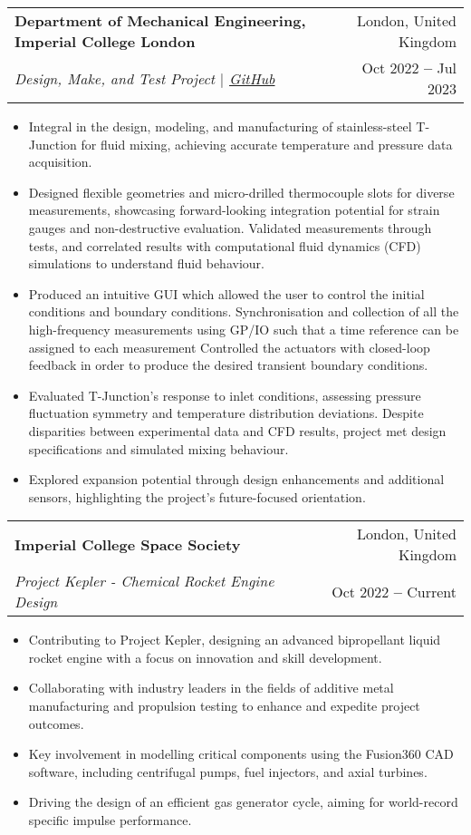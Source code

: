 \documentclass[letterpaper,11pt]{article}
\makeatletter
\newcommand{\resumeItem}[1]{
  \item\small{
    {#1 \vspace{-2pt}}
  }
}
\newcommand{\resumeSubheading}[4]{
  \vspace{-2pt}\item
    \begin{tabular*}{0.97\textwidth}[t]{l@{\extracolsep{\fill}}r}
      \textbf{#1} & #2 \\
      \textit{\small#3} & \small #4 \\
    \end{tabular*}\vspace{-7pt}
}
\newcommand{\resumeItemListStart}{\begin{itemize}}
\newcommand{\resumeItemListEnd}{\end{itemize}\vspace{-5pt}}
\makeatother
\begin{document}
    \resumeSubheading
      {Department of Mechanical Engineering, Imperial College London}{London, United Kingdom}
      {Design, Make, and Test Project $|$ \emph{\href{https://github.com/jimmyvdw/DMT16_DAQ}{\color{blue}GitHub}}}{Oct 2022 \textbf{--} Jul 2023}
        \resumeItemListStart
            \resumeItem{Integral in the design, modeling, and manufacturing of stainless-steel T-Junction for fluid mixing, achieving accurate temperature and pressure data acquisition.}
            \resumeItem{Designed flexible geometries and micro-drilled thermocouple slots for diverse measurements, showcasing forward-looking integration potential for strain gauges and non-destructive evaluation. Validated measurements through tests, and correlated results with computational fluid dynamics (CFD) simulations to understand fluid behaviour.}
            \resumeItem{Produced an intuitive GUI which allowed the user to control the initial conditions and boundary conditions. Synchronisation and collection of all the high-frequency measurements using GP/IO such that a time reference can be assigned to each measurement Controlled the actuators with closed-loop feedback in order to produce the desired transient boundary conditions.}
            \resumeItem{Evaluated T-Junction's response to inlet conditions, assessing pressure fluctuation symmetry and temperature distribution deviations. Despite disparities between experimental data and CFD results, project met design specifications and simulated mixing behaviour.}
            \resumeItem{Explored expansion potential through design enhancements and additional sensors, highlighting the project's future-focused orientation.}
        \resumeItemListEnd
    
    \resumeSubheading
      {Imperial College Space Society}{London, United Kingdom}
      {Project Kepler - Chemical Rocket Engine Design}{Oct 2022 \textbf{--} Current}
        \resumeItemListStart
            \resumeItem{Contributing to Project Kepler, designing an advanced bipropellant liquid rocket engine with a focus on innovation and skill development.}
            \resumeItem{Collaborating with industry leaders in the fields of additive metal manufacturing and propulsion testing to enhance and expedite project outcomes.}
            \resumeItem{Key involvement in modelling critical components using the Fusion360 CAD software, including centrifugal pumps, fuel injectors, and axial turbines.}
            \resumeItem{Driving the design of an efficient gas generator cycle, aiming for world-record specific impulse performance.}
        \resumeItemListEnd
  
\end{document}
